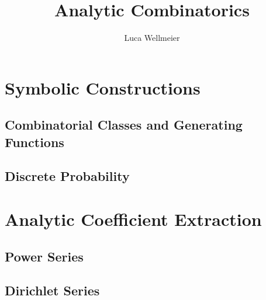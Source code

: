 \documentclass[11pt]{report}
\author{Luca Wellmeier}
\title{Analytic Combinatorics}
\begin{document}

\tableofcontents



\part{Symbolic Constructions}
\chapter{Combinatorial Classes and Generating Functions}

\chapter{Discrete Probability}


\part{Analytic Coefficient Extraction}
\chapter{Power Series}

\chapter{Dirichlet Series}


\printbibliography[
    heading=bibintoc,
    title=References]


\end{document}
